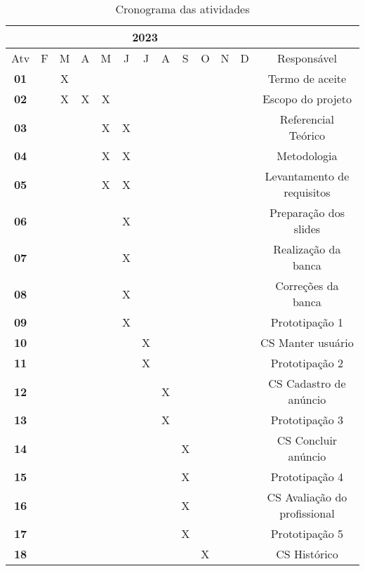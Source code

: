 \begin{table*}[ht]
\centering
\caption{Cronograma das atividades}
\label{tab:cronograma}
    \begin{tabular}{|c|c|c|c|c|c|c|c|c|c|c|c|c|}
        \hline & \multicolumn{11}{|c|}{2023} & \multicolumn{1}{|c|}{} \\
        \hline \multicolumn{1}{|c|}{Atv} & F & M & A & M & J & J & A & S & O & N & D & {Responsável} \\
        \hline \textbf{01} & & X& & & & & & & & & & Termo de aceite \\
        \hline \textbf{02} & & X& X& X& & & & & & & & Escopo do projeto \\
        \hline \textbf{03} & & & & X& X& & & & & & & Referencial Teórico\\
        \hline \textbf{04} & & & & X& X& & & & & & & Metodologia\\
        \hline \textbf{05} & & & & X& X& & & & & & & Levantamento de requisitos\\
        \hline \textbf{06} & & & & & X& & & & & & & Preparação dos slides\\
        \hline \textbf{07} & & & & & X& & & & & & & Realização da banca\\
        \hline \textbf{08} & & & & & X& & & & & & & Correções da banca\\
        \hline \textbf{09} & & & & & X& & & & & & & Prototipação 1\\
        \hline \textbf{10} & & & & & & X& & & & & & CS Manter usuário\\
        \hline \textbf{11} & & & & & & X& & & & & & Prototipação 2\\
        \hline \textbf{12} & & & & & & & X& & & & & CS Cadastro de anúncio\\
        \hline \textbf{13} & & & & & & & X& & & & & Prototipação 3\\
        \hline \textbf{14} & & & & & & & & X& & & & CS Concluir anúncio\\
        \hline \textbf{15} & & & & & & & & X& & & & Prototipação 4\\
        \hline \textbf{16} & & & & & & & & X& & & & CS Avaliação do profissional\\
        \hline \textbf{17} & & & & & & & & X& & & & Prototipação 5\\
        \hline \textbf{18} & & & & & & & & & X& & & CS Histórico\\
        \hline
    \end{tabular} 
\end{table*}

    
    
    